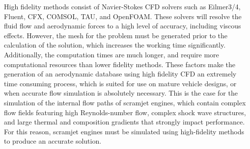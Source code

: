 High fidelity methods consist of Navier-Stokes CFD solvers such as Eilmer3/4\cite{Gollan2013b}, Fluent\cite{Ansys2014}, CFX\cite{CFX}, COMSOL\cite{comsol}, TAU\cite{Schwamborn2006}, and OpenFOAM\cite{openfoam}. These solvers will resolve the fluid flow and aerodynamic forces to a high level of accuracy, including viscous effects. However, the mesh for the problem must be generated prior to the calculation of the solution, which increases the working time significantly. Additionally, the computation times are much longer, and require more computational resources than lower fidelity methods. These factors make the generation of an aerodynamic database using high fidelity CFD an extremely time consuming process, which is suited for use on mature vehicle designs, or when accurate flow simulation is absolutely necessary. 
This is the case for the simulation of the internal flow paths of scramjet engines, which contain complex flow fields featuring high Reynolds-number flow, complex shock wave structures, and large thermal and composition gradients that strongly impact performance\cite{Segal2009}. For this reason, scramjet engines must be simulated using high-fidelity methods to produce an accurate solution. 




